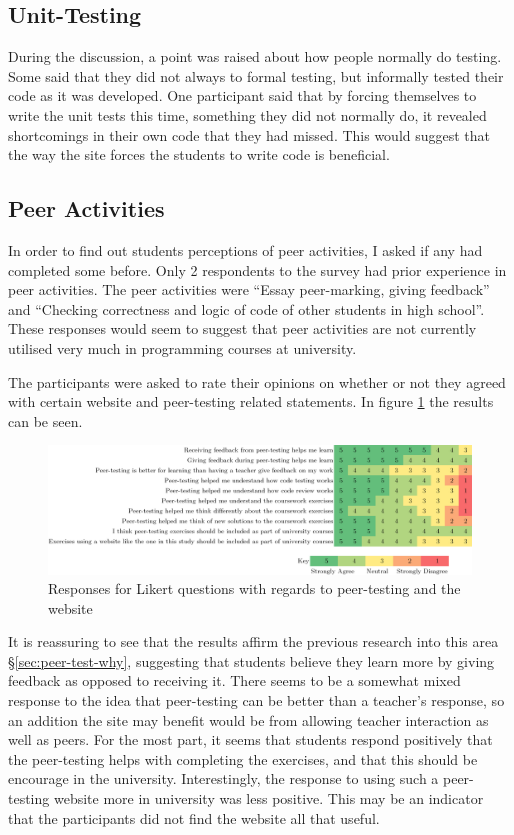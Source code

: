 \documentclass[a4paper,11pt]{report}
\begin{document}
\subsection{Unit-Testing}
During the discussion, a point was raised about how people normally do testing. Some said that they did not always to formal testing, but informally tested their code as it was developed. One participant said that by forcing themselves to write the unit tests this time, something they did not normally do, it revealed shortcomings in their own code that they had missed. This would suggest that the way the site forces the students to write code is beneficial.
\subsection{Peer Activities}
In order to find out students perceptions of peer activities, I asked if any had completed some before. Only 2 respondents to the survey had prior experience in peer activities. The peer activities were ``Essay peer-marking, giving feedback'' and ``Checking correctness and logic of code of other students in high school''. These responses would seem to suggest that peer activities are not currently utilised very much in programming courses at university.\par
The participants were asked to rate their opinions on whether or not they agreed with certain website and peer-testing related statements. In figure \ref{tab:peer-test} the results can be seen.\\
\begin{figure}[ht]
\includegraphics[width=\textwidth]{eva-result/likert-peer-test.png}
\caption{Responses for Likert questions with regards to peer-testing and the website}
\label{tab:peer-test}
\end{figure}\par
It is reassuring to see that the results affirm the previous research into this area \S\ref{sec:peer-test-why}, suggesting that students believe they learn more by giving feedback as opposed to receiving it. There seems to be a somewhat mixed response to the idea that peer-testing can be better than a teacher's response, so an addition the site may benefit would be from allowing teacher interaction as well as peers. For the most part, it seems that students respond positively that the peer-testing helps with completing the exercises, and that this should be encourage in the university. Interestingly, the response to using such a peer-testing website more in university was less positive. This may be an indicator that the participants did not find the website all that useful.\par
\end{document}
